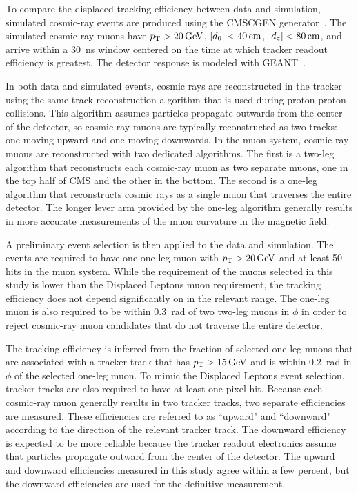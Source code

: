 To compare the displaced tracking efficiency between data and simulation, simulated cosmic-ray events are produced using the CMSCGEN generator~\cite{cmscgen}. The simulated cosmic-ray muons have $\pt>\SI{20}{\GeV}$, $\ad<\SI{40}{\cm}$, $\abs{d_z}<\SI{80}{\cm}$, and arrive within a \SI{30}{\ns} window centered on the time at which tracker readout efficiency is greatest. The detector response is modeled with GEANT~\cite{geant4}.

In both data and simulated events, cosmic rays are reconstructed in the tracker using the same track reconstruction algorithm that is used during proton-proton collisions. This algorithm assumes particles propagate outwards from the center of the detector, so cosmic-ray muons are typically reconstructed as two tracks: one moving upward and one moving downwards. In the muon system, cosmic-ray muons are reconstructed with two dedicated algorithms. The first is a two-leg algorithm that reconstructs each cosmic-ray muon as two separate muons, one in the top half of CMS and the other in the bottom. The second is a one-leg algorithm that reconstructs cosmic rays as a single muon that traverses the entire detector. The longer lever arm provided by the one-leg algorithm generally results in more accurate measurements of the muon curvature in the magnetic field.

A preliminary event selection is then applied to the data and simulation. The events are required to have one one-leg muon with $\pt>\SI{20}{\GeV}$ and at least \num{50} hits in the muon system. While the \pt requirement of the muons selected in this study is lower than the Displaced Leptons muon \pt requirement, the tracking efficiency does not depend significantly on \pt in the relevant range. The one-leg muon is also required to be within \SI{0.3}{\radian} of two two-leg muons in $\phi$ in order to reject cosmic-ray muon candidates that do not traverse the entire detector.

The tracking efficiency is inferred from the fraction of selected one-leg muons that are associated with a tracker track that has $\pt>\SI{15}{\GeV}$ and is within \SI{0.2}{\radian} in $\phi$ of the selected one-leg muon. To mimic the Displaced Leptons event selection, tracker tracks are also required to have at least one pixel hit. Because each cosmic-ray muon generally results in two tracker tracks, two separate efficiencies are measured. These efficiencies are referred to as ``upward" and ``downward" according to the direction of the relevant tracker track. The downward efficiency is expected to be more reliable because the tracker readout electronics assume that particles propagate outward from the center of the detector. The upward and downward efficiencies measured in this study agree within a few percent, but the downward efficiencies are used for the definitive measurement.

